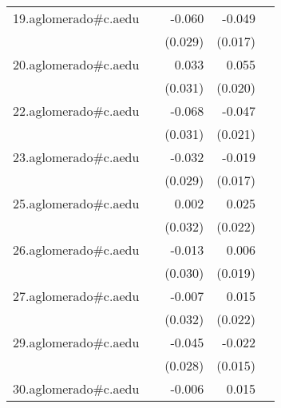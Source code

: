 {\begin{longtable}{l*{4}{D{.}{.}{-1}}}
\addlinespace
19.aglomerado#c.aedu&                     &      -0.060\sym{*}  &      -0.049\sym{**} &                     \\
            &                     &     (0.029)         &     (0.017)         &                     \\
\addlinespace
20.aglomerado#c.aedu&                     &       0.033         &       0.055\sym{**} &                     \\
            &                     &     (0.031)         &     (0.020)         &                     \\
\addlinespace
22.aglomerado#c.aedu&                     &      -0.068\sym{*}  &      -0.047\sym{*}  &                     \\
            &                     &     (0.031)         &     (0.021)         &                     \\
\addlinespace
23.aglomerado#c.aedu&                     &      -0.032         &      -0.019         &                     \\
            &                     &     (0.029)         &     (0.017)         &                     \\
\addlinespace
25.aglomerado#c.aedu&                     &       0.002         &       0.025         &                     \\
            &                     &     (0.032)         &     (0.022)         &                     \\
\addlinespace
26.aglomerado#c.aedu&                     &      -0.013         &       0.006         &                     \\
            &                     &     (0.030)         &     (0.019)         &                     \\
\addlinespace
27.aglomerado#c.aedu&                     &      -0.007         &       0.015         &                     \\
            &                     &     (0.032)         &     (0.022)         &                     \\
\addlinespace
29.aglomerado#c.aedu&                     &      -0.045         &      -0.022         &                     \\
            &                     &     (0.028)         &     (0.015)         &                     \\
\addlinespace
30.aglomerado#c.aedu&                     &      -0.006         &       0.015         &                     \\

\end{longtable}}
